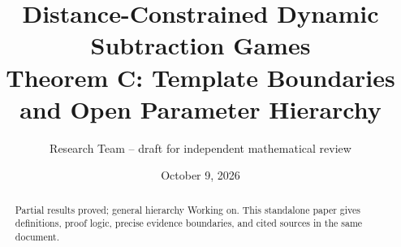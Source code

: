 \documentclass[11pt]{article}
\title{\textbf{Distance-Constrained Dynamic Subtraction Games}\\[0.4em]Theorem C: Template Boundaries and Open Parameter Hierarchy}
\author{Research Team -- draft for independent mathematical review}
\date{October 9, 2026}
\begin{document}
\maketitle
\begin{abstract}Partial results proved; general hierarchy Working on. This standalone paper gives definitions, proof logic, precise evidence boundaries, and cited sources in the same document.\end{abstract}
\tableofcontents




\end{document}
